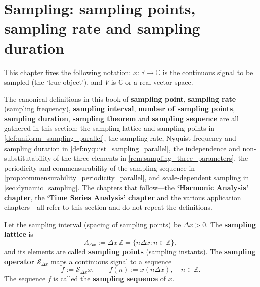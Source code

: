 \section{Sampling: sampling points, sampling rate and sampling duration}\label{sec:sampling_basics}

This chapter fixes the following notation: $x:\mathbb{R}\to\mathbb{C}$ is the continuous signal to be sampled (the `true object'), and $V$ is $\mathbb{C}$ or a real vector space.

\begin{remark}\label{rem:sampling_terminology_home}
The canonical definitions in this book of \textbf{sampling point}, \textbf{sampling rate} (sampling frequency), \textbf{sampling interval}, \textbf{number of sampling points}, \textbf{sampling duration}, \textbf{sampling theorem} and \textbf{sampling sequence} are all gathered in this section: the sampling lattice and sampling points in \cref{def:uniform_sampling_parallel}, the sampling rate, Nyquist frequency and sampling duration in \cref{def:nyquist_sampling_parallel}, the independence and non-substitutability of the three elements in \cref{rem:sampling_three_parameters}, the periodicity and commensurability of the sampling sequence in \cref{prop:commensurability_periodicity_parallel}, and scale-dependent sampling in \cref{sec:dynamic_sampling}. The chapters that follow---the \textbf{`Harmonic Analysis' chapter}, the \textbf{`Time Series Analysis' chapter} and the various application chapters---all refer to this section and do not repeat the definitions.
\end{remark}

\begin{definition}\label{def:uniform_sampling_parallel}
Let the sampling interval (spacing of sampling points) be $\Delta x>0$. The \textbf{sampling lattice} is
\[
\Lambda_{\Delta x}:=\Delta x\,\mathbb{Z}=\{n\Delta x : n\in\mathbb{Z}\},
\]
and its elements are called \textbf{sampling points} (sampling instants). The \textbf{sampling operator} $\mathcal{S}_{\Delta x}$ maps a continuous signal to a sequence
\[
f:=\mathcal{S}_{\Delta x}x,\qquad f(n):=x(n\Delta x),\quad n\in\mathbb{Z}.
\]
The sequence $f$ is called the \textbf{sampling sequence} of $x$.
\end{definition}

